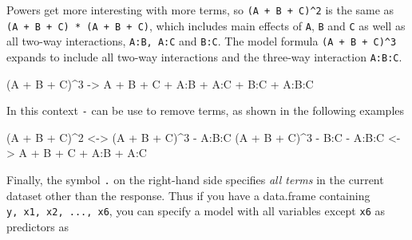 \documentclass[
  letterpaper,
  10pt,
  krantz2]{krantz}
\makeatletter
\newenvironment{Shaded}{\begin{snugshade}}{\end{snugshade}}
\newcommand{\DecValTok}[1]{\textcolor[rgb]{0.68,0.00,0.00}{#1}}
\newcommand{\ErrorTok}[1]{\textcolor[rgb]{0.68,0.00,0.00}{#1}}
\newcommand{\NormalTok}[1]{\textcolor[rgb]{0.00,0.23,0.31}{#1}}
\newcommand{\OtherTok}[1]{\textcolor[rgb]{0.00,0.23,0.31}{#1}}
\newcommand{\SpecialCharTok}[1]{\textcolor[rgb]{0.37,0.37,0.37}{#1}}
\newenvironment{kframe}{%
  \medskip{}
  \setlength{\fboxsep}{.8em}
  \def\at@end@of@kframe{}%
  \ifinner\ifhmode%
  \def\at@end@of@kframe{\end{minipage}}%
  \begin{minipage}{\columnwidth}%
  \fi\fi%
  \def\FrameCommand##1{\hskip\@totalleftmargin \hskip-\fboxsep
  \colorbox{shadecolor}{##1}\hskip-\fboxsep
      \hskip-\linewidth \hskip-\@totalleftmargin \hskip\columnwidth}%
  \MakeFramed {\advance\hsize-\width
    \@totalleftmargin\z@ \linewidth\hsize
    \@setminipage}}%
{\par\unskip\endMakeFramed%
  \at@end@of@kframe}
\renewenvironment{Shaded}{\begin{kframe}}{\end{kframe}}
\makeatother
\begin{document}
Powers get more interesting with more terms, so
\texttt{(A\ +\ B\ +\ C)\^{}2} is the same as
\texttt{(A\ +\ B\ +\ C)\ *\ (A\ +\ B\ +\ C)}, which includes main
effects of \texttt{A}, \texttt{B} and \texttt{C} as well as all two-way
interactions, \texttt{A:B,\ A:C} and \texttt{B:C}. The model formula
\texttt{(A\ +\ B\ +\ C)\^{}3} expands to include all two-way
interactions and the three-way interaction \texttt{A:B:C}.

\begin{Shaded}
\begin{Highlighting}[]
\NormalTok{(A }\SpecialCharTok{+}\NormalTok{ B }\SpecialCharTok{+}\NormalTok{ C)}\SpecialCharTok{\^{}}\DecValTok{3} \OtherTok{{-}\textgreater{}}\NormalTok{ A }\SpecialCharTok{+}\NormalTok{ B }\SpecialCharTok{+}\NormalTok{ C }\SpecialCharTok{+}\NormalTok{ A}\SpecialCharTok{:}\NormalTok{B }\SpecialCharTok{+}\NormalTok{ A}\SpecialCharTok{:}\NormalTok{C }\SpecialCharTok{+}\NormalTok{ B}\SpecialCharTok{:}\NormalTok{C }\SpecialCharTok{+}\NormalTok{ A}\SpecialCharTok{:}\NormalTok{B}\SpecialCharTok{:}\NormalTok{C}
\end{Highlighting}
\end{Shaded}

In this context \texttt{-} can be use to remove terms, as shown in the
following examples

\begin{Shaded}
\begin{Highlighting}[]
\NormalTok{(A }\SpecialCharTok{+}\NormalTok{ B }\SpecialCharTok{+}\NormalTok{ C)}\SpecialCharTok{\^{}}\DecValTok{2} \OtherTok{\textless{}{-}}\ErrorTok{\textgreater{}}\NormalTok{ (A }\SpecialCharTok{+}\NormalTok{ B }\SpecialCharTok{+}\NormalTok{ C)}\SpecialCharTok{\^{}}\DecValTok{3} \SpecialCharTok{{-}}\NormalTok{ A}\SpecialCharTok{:}\NormalTok{B}\SpecialCharTok{:}\NormalTok{C}
\NormalTok{(A }\SpecialCharTok{+}\NormalTok{ B }\SpecialCharTok{+}\NormalTok{ C)}\SpecialCharTok{\^{}}\DecValTok{3} \SpecialCharTok{{-}}\NormalTok{ B}\SpecialCharTok{:}\NormalTok{C }\SpecialCharTok{{-}}\NormalTok{ A}\SpecialCharTok{:}\NormalTok{B}\SpecialCharTok{:}\NormalTok{C  }\OtherTok{\textless{}{-}}\ErrorTok{\textgreater{}}\NormalTok{ A }\SpecialCharTok{+}\NormalTok{ B }\SpecialCharTok{+}\NormalTok{ C }\SpecialCharTok{+}\NormalTok{ A}\SpecialCharTok{:}\NormalTok{B }\SpecialCharTok{+}\NormalTok{ A}\SpecialCharTok{:}\NormalTok{C }
\end{Highlighting}
\end{Shaded}

Finally, the symbol \texttt{.} on the right-hand side specifies
\emph{all terms} in the current dataset other than the response. Thus if
you have a data.frame containing \texttt{y,\ x1,\ x2,\ ...,\ x6}, you
can specify a model with all variables except \texttt{x6} as predictors
as
\end{document}

